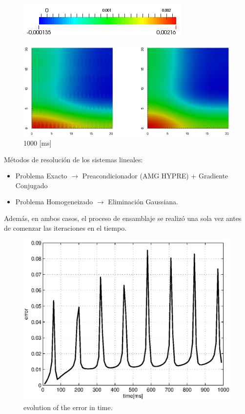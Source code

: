 \documentclass[11pt,spanish]{beamer}
\begin{document}
\begin{frame}
\begin{figure}[H]
\centering
\includegraphics[height = 0.9 cm]{fig/numerical_example_MDE_exp3_colourbar}
\end{figure}
\begin{figure}[H]
\centering
\includegraphics[height = 5 cm]{fig/numerical_example_MDE_exp3_1000ms}
\caption{1000 [ms]}
\end{figure}
\end{frame}

\begin{frame}

Métodos de resolución de los sistemas lineales:

\begin{itemize}
\item Problema Exacto \pause $\rightarrow$ Preacondicionador (AMG HYPRE) + Gradiente Conjugado 
\item Problema Homogeneizado \pause $\rightarrow$ Eliminación Gaussiana.
\end{itemize}

Además, en ambos casos, el proceso de ensamblaje se realizó una sola vez antes de comenzar las iteraciones en el tiempo.
\pause
\begin{figure}[H]
\centering
\includegraphics[height = 3.5 cm]{fig/numerical_example_MDE_exp3_error}
\caption{evolution of the error in time.}\label{fig:mde_ex3_error}
\end{figure}
\end{frame}
\end{document}
